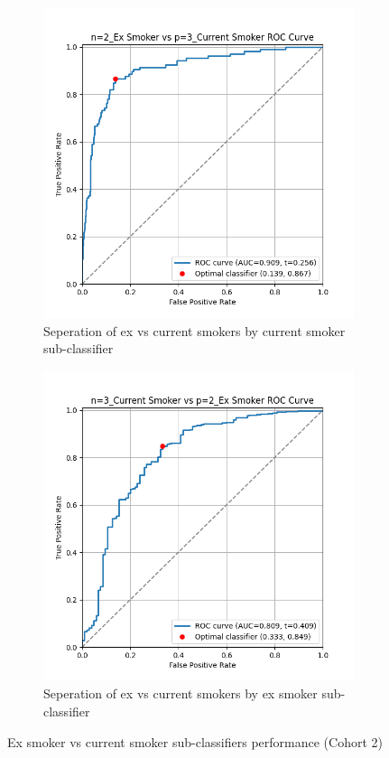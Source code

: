 \documentclass{article}
\begin{document}
\begin{figure}
    \begin{subfigure}{0.48\textwidth}
        \centering
        \includegraphics[width=\linewidth]{cohort2_2v3_roc.png}
        \caption{Seperation of ex vs current smokers by current smoker sub-classifier}
    \end{subfigure}
    \hfill
    \begin{subfigure}{0.48\textwidth}
        \centering
        \includegraphics[width=\linewidth]{cohort2_3v2_roc.png}
        \caption{Seperation of ex vs current smokers by ex smoker sub-classifier}
    \end{subfigure}
    \caption{Ex smoker vs current smoker sub-classifiers performance (Cohort 2)}
\end{figure}
\end{document}
